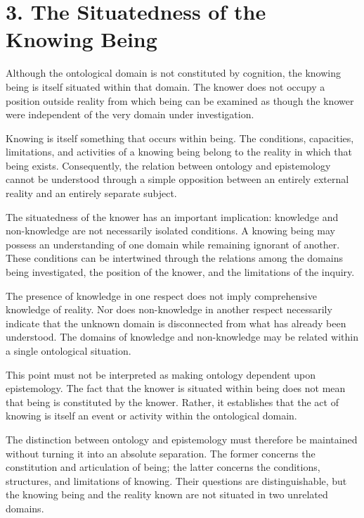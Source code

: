 
\section*{3. The Situatedness of the Knowing Being}

Although the ontological domain is not constituted by
cognition, the knowing being is itself situated within
that domain. The knower does not occupy a position outside
reality from which being can be examined as though the
knower were independent of the very domain under investigation.

Knowing is itself something that occurs within being.
The conditions, capacities, limitations, and activities
of a knowing being belong to the reality in which that
being exists. Consequently, the relation between ontology
and epistemology cannot be understood through a simple
opposition between an entirely external reality and an
entirely separate subject.

The situatedness of the knower has an important implication:
knowledge and non-knowledge are not necessarily isolated
conditions. A knowing being may possess an understanding
of one domain while remaining ignorant of another. These
conditions can be intertwined through the relations among
the domains being investigated, the position of the knower,
and the limitations of the inquiry.

The presence of knowledge in one respect does not imply
comprehensive knowledge of reality. Nor does non-knowledge
in another respect necessarily indicate that the unknown
domain is disconnected from what has already been understood.
The domains of knowledge and non-knowledge may be related
within a single ontological situation.

This point must not be interpreted as making ontology
dependent upon epistemology. The fact that the knower is
situated within being does not mean that being is constituted
by the knower. Rather, it establishes that the act of knowing
is itself an event or activity within the ontological domain.

The distinction between ontology and epistemology must
therefore be maintained without turning it into an absolute
separation. The former concerns the constitution and
articulation of being; the latter concerns the conditions,
structures, and limitations of knowing. Their questions
are distinguishable, but the knowing being and the reality
known are not situated in two unrelated domains.

